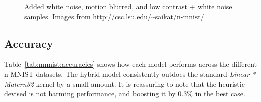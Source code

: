 \documentclass{article}
\begin{document}
\begin{figure}[htb]
\centering
{}
\centering
{}
\centering
{}

\caption{Added white noise, motion blurred, and low contrast + white noise samples. Images from \url{http://csc.lsu.edu/~saikat/n-mnist/}}
\end{figure}



\subsection{Accuracy}


Table~\ref{tab:nmnist:accuracies} shows how each model performs across the different n-MNIST datasets. The hybrid model consistently outdoes the standard \textit{Linear * Matern32} kernel by a small amount. It is reassuring to note that the heuristic devised is not harming performance, and boosting it by 0.3\% in the best case.


\end{document}
